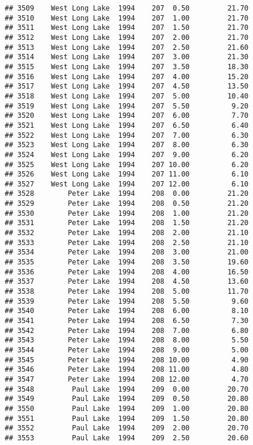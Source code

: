 \documentclass[
]{article}
\begin{document}
\begin{verbatim}
## 3509    West Long Lake  1994    207  0.50         21.70
## 3510    West Long Lake  1994    207  1.00         21.70
## 3511    West Long Lake  1994    207  1.50         21.70
## 3512    West Long Lake  1994    207  2.00         21.70
## 3513    West Long Lake  1994    207  2.50         21.60
## 3514    West Long Lake  1994    207  3.00         21.30
## 3515    West Long Lake  1994    207  3.50         18.30
## 3516    West Long Lake  1994    207  4.00         15.20
## 3517    West Long Lake  1994    207  4.50         13.50
## 3518    West Long Lake  1994    207  5.00         10.40
## 3519    West Long Lake  1994    207  5.50          9.20
## 3520    West Long Lake  1994    207  6.00          7.70
## 3521    West Long Lake  1994    207  6.50          6.40
## 3522    West Long Lake  1994    207  7.00          6.30
## 3523    West Long Lake  1994    207  8.00          6.30
## 3524    West Long Lake  1994    207  9.00          6.20
## 3525    West Long Lake  1994    207 10.00          6.20
## 3526    West Long Lake  1994    207 11.00          6.10
## 3527    West Long Lake  1994    207 12.00          6.10
## 3528        Peter Lake  1994    208  0.00         21.20
## 3529        Peter Lake  1994    208  0.50         21.20
## 3530        Peter Lake  1994    208  1.00         21.20
## 3531        Peter Lake  1994    208  1.50         21.20
## 3532        Peter Lake  1994    208  2.00         21.10
## 3533        Peter Lake  1994    208  2.50         21.10
## 3534        Peter Lake  1994    208  3.00         21.00
## 3535        Peter Lake  1994    208  3.50         19.60
## 3536        Peter Lake  1994    208  4.00         16.50
## 3537        Peter Lake  1994    208  4.50         13.60
## 3538        Peter Lake  1994    208  5.00         11.70
## 3539        Peter Lake  1994    208  5.50          9.60
## 3540        Peter Lake  1994    208  6.00          8.10
## 3541        Peter Lake  1994    208  6.50          7.30
## 3542        Peter Lake  1994    208  7.00          6.80
## 3543        Peter Lake  1994    208  8.00          5.50
## 3544        Peter Lake  1994    208  9.00          5.00
## 3545        Peter Lake  1994    208 10.00          4.90
## 3546        Peter Lake  1994    208 11.00          4.80
## 3547        Peter Lake  1994    208 12.00          4.70
## 3548         Paul Lake  1994    209  0.00         20.70
## 3549         Paul Lake  1994    209  0.50         20.80
## 3550         Paul Lake  1994    209  1.00         20.80
## 3551         Paul Lake  1994    209  1.50         20.80
## 3552         Paul Lake  1994    209  2.00         20.70
## 3553         Paul Lake  1994    209  2.50         20.60

\end{verbatim}
\end{document}

